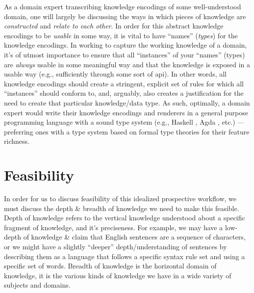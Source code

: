 As a domain expert transcribing knowledge encodings of some well-understood
domain, one will largely be discussing the ways in which pieces of knowledge are
\textit{constructed} and \textit{relate to each other}. In order for this
abstract knowledge encodings to be \textit{usable} in some way, it is vital to
have ``names'' (\textit{types}) for the knowledge encodings. In working to
capture the working knowledge of a domain, it's of utmost importance to ensure
that all ``instances'' of your ``names'' (types) are \textit{always} usable in
some meaningful way and that the knowledge is exposed in a usable way (e.g.,
sufficiently through some sort of \acs{api}). In other words, all knowledge
encodings should create a stringent, explicit set of rules for which all
``instances'' should conform to, and, arguably, also creates a justification for
the need to create that particular knowledge/data type. As such, optimally, a
domain expert would write their knowledge encodings and renderers in a general
purpose programming language with a sound type system (e.g., Haskell
\cite{Haskell2010}, Agda \cite{Norell2007}, etc.) — preferring ones with a type
system based on formal type theories for their feature richness.

\section{Feasibility}
\label{sec:idlgy:feasibility}

In order for us to discuss feasibility of this idealized prospective workflow,
we must discuss the depth \& breadth of knowledge we need to make this feasible.
Depth of knowledge refers to the vertical knowledge understood about a specific
fragment of knowledge, and it's preciseness. For example, we may have a
low-depth of knowledge \& claim that English sentences are a sequence of
characters, or we might have a slightly ``deeper'' depth/understanding  of
sentences by describing them as a language that follows a specific syntax rule
set and using a specific set of words. Breadth of knowledge is the horizontal
domain of knowledge, it is the various kinds of knowledge we have in a wide
variety of subjects and domains.

